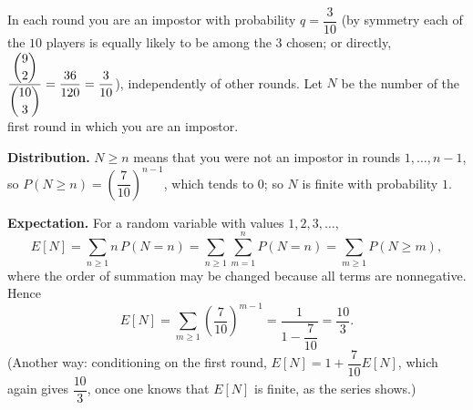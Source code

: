 In each round you are an impostor with probability $q=\dfrac{3}{10}$ (by symmetry each of the $10$ players is equally likely to be among the $3$ chosen; or directly, $\dfrac{\dbinom92}{\dbinom{10}{3}}=\dfrac{36}{120}=\dfrac3{10}$), independently of other rounds. Let $N$ be the number of the first round in which you are an impostor.

\textbf{Distribution.} $N\ge n$ means that you were not an impostor in rounds $1,\dots,n-1$, so $P(N\ge n)=\left(\dfrac{7}{10}\right)^{n-1}$, which tends to $0$; so $N$ is finite with probability $1$.

\textbf{Expectation.} For a random variable with values $1,2,3,\dots$,
\[E[N]=\sum_{n\ge1}n\,P(N=n)=\sum_{n\ge1}\sum_{m=1}^{n}P(N=n)=\sum_{m\ge1}P(N\ge m),\]
where the order of summation may be changed because all terms are nonnegative. Hence
\[E[N]=\sum_{m\ge1}\left(\dfrac{7}{10}\right)^{m-1}=\dfrac{1}{1-\dfrac{7}{10}}=\boxed{\dfrac{10}{3}}.\]
(Another way: conditioning on the first round, $E[N]=1+\dfrac{7}{10}E[N]$, which again gives $\dfrac{10}{3}$, once one knows that $E[N]$ is finite, as the series shows.)
